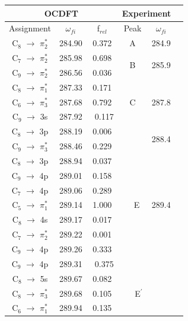 \documentclass[11.5pt]{article}
\begin{document}
\begin{table}
 \centering
     \begin{tabular}{c@{\hskip 0.22in}c@{\hskip 0.22in}c@{\hskip 0.52in}c@{\hskip 0.22in}c@{\hskip 0.22in}c}
     \hline
     \hline
   \multicolumn{3}{c}{OCDFT} &\multicolumn{2}{c}{Experiment} \\
   \hline
   Assignment & $\omega_{fi}$ & f$_{rel}$ & Peak &  $\omega_{fi}$   \\
   \hline
 C$_8$ $\rightarrow$ $\pi^*_2$ & 284.90 & 0.372 & A & 284.9 \vspace{2mm}\\
 C$_7$ $\rightarrow$ $\pi^*_2$ & 285.98 & 0.698 &  \multirow{2}{*}{B} & \multirow{2}{*}{285.9}\\
 C$_9$ $\rightarrow$ $\pi^*_2$ & 286.56 & 0.036 \vspace{2mm}\\
 C$_8$ $\rightarrow$ $\pi^*_1$ & 287.33 & 0.171 & \multirow{3}{*}{C} & \multirow{3}{*}{287.8} \\
 C$_6$ $\rightarrow$ $\pi^*_3$& 287.68 & 0.792 \\
 C$_9$ $\rightarrow$ 3s & 287.92 & \ 0.117 
 \vspace{2mm}\\
 C$_8$ $\rightarrow$ 3p& 288.19 & 0.006 & \ \ \multirow{2}{*}{D} & \multirow{2}{*}{288.4}
 \\
 C$_9$ $\rightarrow$ $\pi^*_3$ & 288.46 & 0.229 &
 \vspace{2mm}\\
 C$_8$ $\rightarrow$ 3p & 288.94 & 0.037 &\multirow{7}{*}{\ \ E} & \multirow{7}{*}{289.4} \\
 C$_9$ $\rightarrow$ 4p & 289.01 & 0.158 \\
 C$_7$ $\rightarrow$ 4p & 289.06 & 0.289 \\
 C$_5$ $\rightarrow$ $\pi^*_1$ & 289.14 & 1.000 \\
 C$_8$ $\rightarrow$ 4s & 289.17 & 0.017 \\
 C$_7$ $\rightarrow$ $\pi^*_2$ & 289.22 & 0.001 \\
 C$_9$ $\rightarrow$ 4p & 289.26 & 0.333 \\
 C$_9$ $\rightarrow$ 4p & 289.31 & \ 0.375 
 \vspace{2mm}\\
 C$_8$ $\rightarrow$ 5s & 289.67 & 0.082& \multirow{3}{*}{\ \ \ E$^{\prime}$} \\
 C$_8$ $\rightarrow$ $\pi^*_3$ & 289.68 & 0.105 \\
 C$_6$ $\rightarrow$ $\pi^*_1$ & 289.94 & 0.135 \vspace{2mm}\\

\end{tabular}
\end{table}
\end{document}
